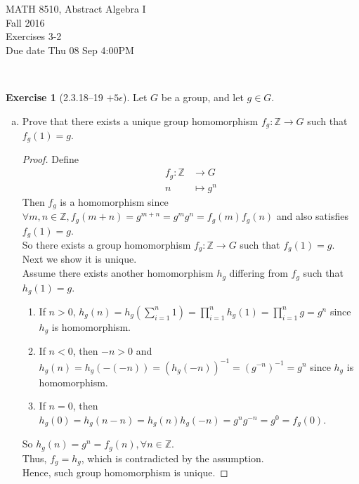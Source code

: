 \documentclass{amsart}
\newcommand{\bbz}{\mathbb{Z}}
\theoremstyle{plain}
\theoremstyle{definition}
\newtheorem{exer}[lem]{Exercise}
\begin{document}
\noindent MATH 8510, Abstract Algebra I \\
Fall 2016\\
Exercises 3-2\\
Due date Thu 08 Sep 4:00PM

\

%
%

\begin{exer}[2.3.18--19 $+5\epsilon$]
Let $G$ be a group, and let $g\in G$.
\begin{enumerate}[(a)]
\item Prove that there exists a unique group homomorphism $f_g\colon\bbz\to G$ such that $f_g(1)=g$. 
	\begin{proof}
		Define
		\begin{align*}
			f_g:\bbz & \to G \\
			n & \mapsto g^n
		\end{align*}
		Then $f_g$ is a homomorphism since $\forall m,n \in \bbz, f_g(m+n) = g^{m+n} = g^mg^n = f_g(m)f_g(n)$ and also satisfies $f_g(1) = g$.\\
		So there exists a group homomorphism $f_g\colon\bbz\to G$ such that $f_g(1)=g$.\\
		Next we show it is unique.\\
		Assume there exists another homomorphism $h_g$ differing from $f_g$ such that $h_g(1) = g$. 
		\begin{enumerate}
			\item If $n > 0$, $h_g(n) = h_g(\sum_{i=1}^n1) = \prod_{i=1}^nh_g(1) = \prod_{i=1}^n g = g^n$ since $h_g$ is homomorphism.
			\item If $n < 0$, then $-n > 0$ and $h_g(n) = h_g(-(-n)) = (h_g(-n))^{-1} = (g^{-n})^{-1} = g^n$ since $h_g$ is homomorphism.
			\item If $n = 0$, then $h_g(0) = h_g(n-n) = h_g(n)h_g(-n) = g^ng^{-n} = g^0 = f_g(0)$.
		\end{enumerate}
		So $h_g(n) = g^n = f_g(n), \forall n \in \bbz$. \\
		Thus, $f_g = h_g$, which is contradicted by the assumption.\\
		Hence, such group homomorphism is unique.
	\end{proof}
	

\end{enumerate}
\end{exer}
\end{document}
